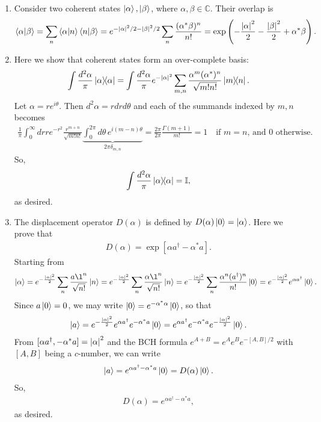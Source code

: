 \documentclass{article}
\theoremstyle{definition}
\newcommand{\al}{\alpha}
\newcommand{\be}{\beta}
\newcommand{\f}[2]{\frac{#1}{#2}}
\newcommand{\lp}{\left(}
\newcommand{\rp}{\right)}
\newcommand{\lb}{\left[}
\newcommand{\rb}{\right]}
\begin{document}
\begin{enumerate}[label=\alph*)]
	\item Consider two coherent states $\ket{\al}, \ket{\be}$, where $\al,\be\in \mathbb{C}$. Their overlap is 
	\begin{align*}
		\bra{\al}\ket{\be} = \sum_n \braket{\al}{n}\braket{n}{\be} 
		= e^{-\abs{\al}^2/2 -\abs{\be}^2/2 }  \sum_n \f{(\al^* \be)^n}{n!} = \exp\lp -\f{\abs{\al}^2}{2} -\f{\abs{\be}^2}{2} + \al^*\be  \rp.
	\end{align*}


	\item Here we show that coherent states form an over-complete basis:
	\begin{align*}
		\int \f{d^2\al}{\pi} \ketbra{\al} = \int \f{d^2\al}{\pi} e^{-\abs{\al}^2} \sum_{m,n} \f{\al^m (\al^*)^n}{\sqrt{m!n!}} \ketbra{m}{n}.
	\end{align*}
	Let $\al = re^{i\theta}$. Then $d^2\al = r drd\theta$ and each of the summands indexed by $m,n$ becomes
	\begin{align*}
	\f{1}{\pi}\int_0^\infty dr r  e^{-r^2}  \f{r^{m+n}}{\sqrt{m!n!}} \underbrace{ \int_{0}^{2\pi} d\theta\, e^{i(m-n)\theta} }_{2\pi \delta_{m,n}} = \f{2\pi}{2\pi}\f{\Gamma(m+1)}{m!} = 1  \quad  \text{if $m=n$, and $0$ otherwise}.
	\end{align*}
	So, 
	\begin{align*}
	\int \f{d^2 \al}{\pi} \ketbra{\al} = \mathbb{I},
	\end{align*}
	as desired. 
	
	\item The displacement operator $D(\al)$ is defined by $D(\al)\ket{0} = \ket{\al}$. Here we prove that 
	\begin{align*}
		D(\al) = \exp\lb \al a^\dagger - \al^* a \rb.
	\end{align*}
	Starting from 
	\begin{align*}
	\ket{\al} = e^{-\f{\abs{\al}^2}{2}} \sum_{n} \f{a\l^n}{\sqrt{n!}}\ket{n} = e^{-\f{\abs{\al}^2}{2}} \sum_{n} \f{\al\l^n}{\sqrt{n!}}\ket{n} = e^{-\f{\abs{\al}^2}{2}} \sum_n \f{\al^n (a^\dagger)^n}{n!} \ket{0} = e^{-\f{\abs{\al}^2}{2}} e^{\al a^\dagger} \ket{0}.
	\end{align*}
	Since $a\ket{0} = 0$, we may write $\ket{0} = e^{-\al^* \al} \ket{0}$, so that
	\begin{align*}
	\ket{a} = e^{-\f{\abs{\al}^2}{2} } e^{\al a^\dagger} e^{-\al^* a} \ket{0} = e^{\al a^\dagger} e^{-\al^* a} e^{-\f{\abs{\al}^2}{2}} \ket{0}.
	\end{align*}
	From $[\al a^\dagger, -\al^* a] = \abs{\al}^2$ and the BCH formula $e^{A+B} = e^A e^B e^{-[A,B]/2}$ with $[A,B]$ being a $c$-number, we can write 
	\begin{align*}
	\ket{a} = e^{\al a^\dagger - \al^* a} \ket{0} = D(\al)\ket{0}.
	\end{align*}
	So,
	\begin{align*}
	D(\al) = e^{\al a^\dagger - \al^* a},
	\end{align*}
	 as desired. 
	

\end{enumerate}
\end{document}
